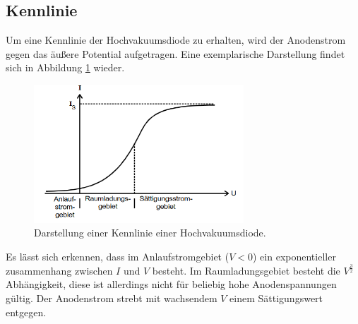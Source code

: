 \subsection{Kennlinie}
Um eine Kennlinie der Hochvakuumsdiode zu erhalten, wird der Anodenstrom gegen das äußere Potential
aufgetragen. Eine exemplarische Darstellung findet sich in Abbildung \ref{fig:kennlinie} wieder.
\begin{figure}
 \centering
 \includegraphics[width=0.7\textwidth]{kennlinie.png}
 \caption{Darstellung einer Kennlinie einer Hochvakuumsdiode.\cite{sample}}
 \label{fig:kennlinie}
 \end{figure}
Es lässt sich erkennen, dass im Anlaufstromgebiet ($V<0$) ein exponentieller zusammenhang
zwischen $I$ und $V$ besteht. Im Raumladungsgebiet besteht die $V^{\frac{3}{2}}$ Abhängigkeit, diese ist
allerdings nicht für beliebig hohe Anodenspannungen gültig. Der Anodenstrom strebt mit wachsendem $V$
einem Sättigungswert entgegen.
